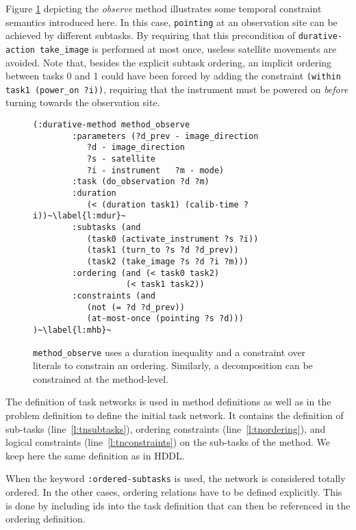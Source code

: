 \documentclass[letterpaper]{article} %
\begin{document}
Figure \ref{pddl_durative_m_con} depicting the \textit{observe} method illustrates some temporal constraint semantics introduced here.
In this case, \texttt{pointing} at an observation site can be achieved by different subtasks. By requiring that this precondition of \mbox{\small\lstinline[language={pddl},basicstyle=\ttfamily]|durative-action take_image|} is performed  at most once, useless satellite movements are avoided.
Note that, besides the explicit subtask ordering, an implicit ordering between tasks 0 and 1 could have been forced by adding the constraint  \mbox{\small\lstinline[language={pddl},basicstyle=\ttfamily]|(within task1 (power_on ?i))|}, requiring that the instrument must be powered on \emph{before} turning towards the observation site.
%
\begin{figure}[h!]
	\begin{lstlisting}[language=pddl, basicstyle=\fontsize{8.5}{10}\selectfont\ttfamily, escapechar=~]
	(:durative-method method_observe
		:parameters (?d_prev - image_direction
		   ?d - image_direction
		   ?s - satellite
		   ?i - instrument   ?m - mode)
		:task (do_observation ?d ?m)
		:duration
		   (< (duration task1) (calib-time ?i))~\label{l:mdur}~
		:subtasks (and
		   (task0 (activate_instrument ?s ?i))
		   (task1 (turn_to ?s ?d ?d_prev))
		   (task2 (take_image ?s ?d ?i ?m)))
		:ordering (and (< task0 task2)
                   (< task1 task2))
		:constraints (and
		   (not (= ?d ?d_prev))
		   (at-most-once (pointing ?s ?d))) )~\label{l:mhb}~
	\end{lstlisting}
	\caption{\texttt{method\_observe} uses a duration inequality and a constraint over literals to constrain an ordering. Similarly, a decomposition can be constrained at the method-level.\label{pddl_durative_m_con}}
\end{figure}


%
%
The definition of task networks is used in method definitions as well as in the problem definition to define the initial task network. It contains the definition of sub-tasks (line~\ref{l:tnsubtasks}), ordering constraints (line~\ref{l:tnordering}), and logical constraints (line~\ref{l:tnconstraints}) on the sub-tasks of the method. We keep here the same definition as in HDDL.

When the keyword \verb+:ordered-subtasks+ is used, the network is considered totally ordered. In the other cases, ordering relations have to be defined explicitly. This is done by including ids into the task definition that can then be referenced in the ordering definition.
\end{document}
